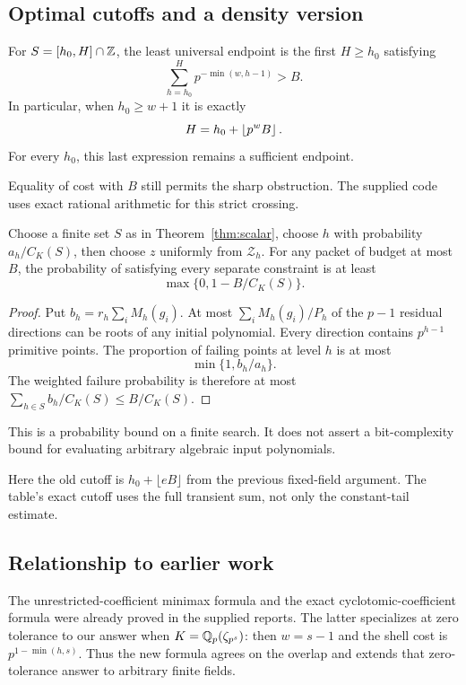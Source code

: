 \subsection{Optimal cutoffs and a density version}
\begin{corollary}
\label{cor:cutoff}
For $S=[h_0,H]\cap\mathbb Z$, the least universal endpoint is the first $H\ge h_0$ satisfying
\[
 \sum_{h=h_0}^{H}p^{-\min(w,h-1)}>B.
\]
In particular, when $h_0\ge w+1$ it is exactly
\[
 H=h_0+\left\lfloor p^wB\right\rfloor.
\]
For every $h_0$, this last expression remains a sufficient endpoint.
\end{corollary}
Equality of cost with $B$ still permits the sharp obstruction. The supplied code uses exact rational arithmetic for this strict crossing.

\begin{corollary}
\label{cor:density}
Choose a finite set $S$ as in Theorem~\ref{thm:scalar}, choose $h$ with probability $a_h/C_K(S)$, then choose $z$ uniformly from $\mathcal Z_h$. For any packet of budget at most $B$, the probability of satisfying every separate constraint is at least
\[
 \max\{0,1-B/C_K(S)\}.
\]
\end{corollary}
\begin{proof}
Put $b_h=r_h\sum_iM_h(g_i)$. At most $\sum_iM_h(g_i)/P_h$ of the $p-1$ residual directions can be roots of any initial polynomial. Every direction contains $p^{h-1}$ primitive points. The proportion of failing points at level $h$ is at most
\[
 \min\{1,b_h/a_h\}.
\]
The weighted failure probability is therefore at most
$\sum_{h\in S}b_h/C_K(S)\le B/C_K(S)$.
\end{proof}
This is a probability bound on a finite search. It does not assert a bit-complexity bound for evaluating arbitrary algebraic input polynomials.

\begin{center}
\small

\end{center}
Here the old cutoff is $h_0+\lfloor eB\rfloor$ from the previous fixed-field argument. The table's exact cutoff uses the full transient sum, not only the constant-tail estimate.

\subsection{Relationship to earlier work}
\label{sec:scalar-literature}
The unrestricted-coefficient minimax formula and the exact cyclotomic-coefficient formula were already proved in the supplied reports. The latter specializes at zero tolerance to our answer when $K=\mathbb Q_p(\zeta_{p^s})$: then $w=s-1$ and the shell cost is $p^{1-\min(h,s)}$. Thus the new formula agrees on the overlap and extends that zero-tolerance answer to arbitrary finite fields.

